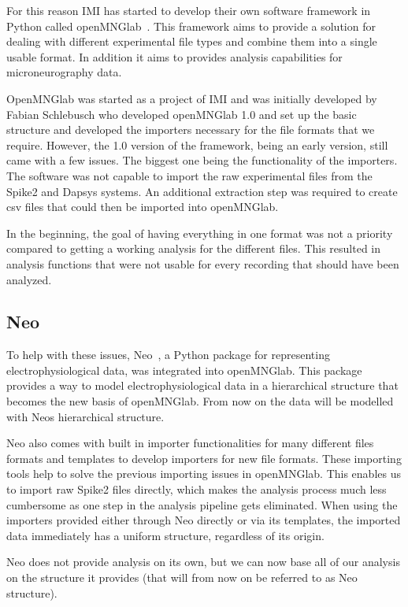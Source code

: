 For this reason IMI has started to develop their own software framework in Python called openMNGlab~\cite{schlebusch_openmnglab_2021}.  This framework aims to provide a solution for dealing with different experimental file types and combine them into a single usable format.  In addition it aims to provides analysis capabilities for microneurography data.

OpenMNGlab was started as a project of IMI and was initially developed by Fabian Schlebusch who developed openMNGlab 1.0 and set up the basic structure and developed the importers necessary for the file formats that we require. However, the 1.0 version of the framework, being an early version,  still came with a few issues. The biggest one being the functionality of the importers. The software was not capable to import the raw experimental files from the Spike2 and Dapsys systems. An additional extraction step was required to create csv files that could then be imported into openMNGlab. 

In the beginning, the goal of having everything in one format was not a priority compared to getting a working analysis for the different files. This resulted in analysis functions that were not usable for every recording that should have been analyzed.

\subsection{Neo}
To help with these issues, Neo~\cite{neo14}, a Python package for representing electrophysiological data, was integrated into openMNGlab. This package provides a way to model electrophysiological data in a hierarchical structure that becomes the new basis of openMNGlab. From now on the data will be modelled with Neos hierarchical structure. 

Neo also comes with built in importer functionalities for many different files formats and templates to develop importers for new file formats.  These importing tools help to solve the previous importing issues in openMNGlab. This enables us to import raw Spike2 files directly, which makes the analysis process much less cumbersome as one step in the analysis pipeline gets eliminated. When using the importers provided either through Neo directly or via its templates, the imported data immediately has a uniform structure, regardless of its origin.

Neo does not provide analysis on its own, but we can now base all of our analysis on the structure it provides (that will from now on be referred to as Neo structure). \\

